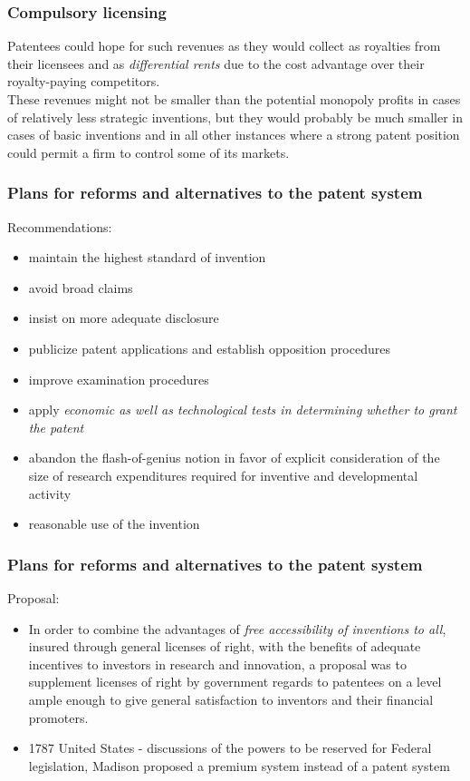 \begin{frame}
\frametitle{Compulsory licensing}
Patentees could hope for such revenues as they would collect as royalties from their licensees and as \textit{differential rents} due to the cost advantage over their royalty-paying competitors.\\
These revenues might not be smaller than the potential monopoly profits in cases of relatively less strategic inventions, but they would probably be much smaller in cases of basic inventions and in all other instances where a strong patent position could permit a firm to control some of its markets.
\end{frame}

\begin{frame}
\frametitle{Plans for reforms and alternatives to the patent system}
Recommendations:
\begin{itemize}
	\item maintain the highest standard of invention
    \item avoid broad claims
    \item insist on more adequate disclosure
    \item publicize patent applications and establish opposition procedures
    \item improve examination procedures
    \item apply \textit{economic as well as technological tests in determining whether to grant the patent}
    \item abandon the flash-of-genius notion in favor of explicit consideration of the size of research expenditures required for inventive and developmental activity
    \item reasonable use of the invention
\end{itemize}
\end{frame}


\begin{frame}
\frametitle{Plans for reforms and alternatives to the patent system}
Proposal:\\
\begin{itemize}
	\item In order to combine the advantages of \textit{free accessibility of inventions to all}, insured through general licenses of right, with the benefits of adequate incentives to investors in research and innovation, a proposal was to supplement licenses of right by government regards to patentees on a level ample enough to give general satisfaction to inventors and their financial promoters.
	\item 1787 United States - discussions of the powers to be reserved for Federal legislation, Madison proposed a premium system instead of a patent system
\end{itemize}
\end{frame}

